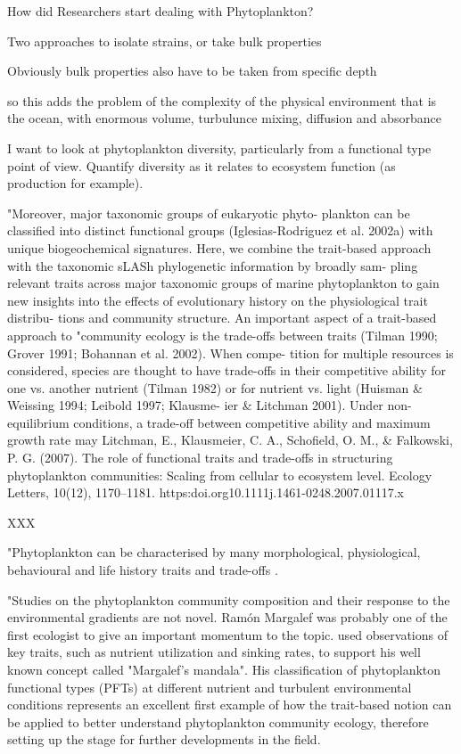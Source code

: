 How did Researchers start dealing with Phytoplankton?

Two approaches to isolate strains, or take bulk properties

Obviously bulk properties also have to be taken from specific depth

so this adds the problem of the complexity of the physical environment that is the ocean, with enormous volume, turbulunce mixing, diffusion and absorbance

I want to look at phytoplankton diversity, particularly from a functional type point of view. Quantify diversity as it relates to ecosystem function (as production for example).


"Moreover, major taxonomic groups of eukaryotic phyto- plankton can be classified into distinct functional groups (Iglesias-Rodriguez et al. 2002a) with unique biogeochemical signatures. Here, we combine the trait-based approach with the taxonomic sLASh phylogenetic information by broadly sam- pling relevant traits across major taxonomic groups of marine phytoplankton to gain new insights into the effects of evolutionary history on the physiological trait distribu- tions and community structure. An important aspect of a trait-based approach to
"community ecology is the trade-offs between traits (Tilman 1990; Grover 1991; Bohannan et al. 2002). When compe- tition for multiple resources is considered, species are thought to have trade-offs in their competitive ability for one vs. another nutrient (Tilman 1982) or for nutrient vs. light (Huisman \& Weissing 1994; Leibold 1997; Klausme- ier \& Litchman 2001). Under non-equilibrium conditions, a trade-off between competitive ability and maximum growth rate may
Litchman, E., Klausmeier, C. A., Schofield, O. M., \& Falkowski, P. G. (2007). The role of functional traits and trade-offs in structuring phytoplankton communities: Scaling from cellular to ecosystem level. Ecology Letters, 10(12), 1170–1181. https:doi.org10.1111j.1461-0248.2007.01117.x


XXX

"Phytoplankton can be characterised by many morphological, physiological, behavioural and life history traits and trade-offs \citep{Litchman2008, Litchman2010}.

"Studies on the phytoplankton community composition and their response to the environmental gradients are not novel. Ramón Margalef was probably one of the first ecologist to give an important momentum to the topic.  \citep{Margalef1978} used observations of key traits, such as nutrient utilization and sinking rates, to support his well known concept called "Margalef's mandala". His classification of phytoplankton functional types (PFTs) at different nutrient and turbulent environmental conditions represents an excellent first example of how the trait-based notion can be applied to better understand phytoplankton community ecology, therefore setting up the stage for further developments in the field.


